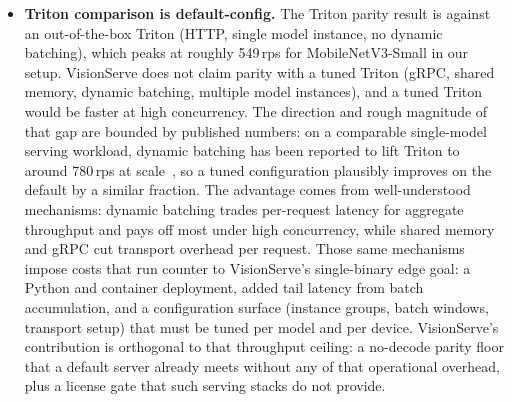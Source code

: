 \begin{itemize}
    \item \textbf{Triton comparison is default-config.}
          The Triton parity result is against an out-of-the-box Triton (HTTP, single
          model instance, no dynamic batching), which peaks at roughly 549\,rps for
          MobileNetV3-Small in our setup. VisionServe does not claim parity with a
          tuned Triton (gRPC, shared memory, dynamic batching, multiple model
          instances), and a tuned Triton would be faster at high concurrency. The
          direction and rough magnitude of that gap are bounded by published numbers:
          on a comparable single-model serving workload, dynamic batching has been
          reported to lift Triton to around 780\,rps at scale~\cite{ali2026fastapitriton},
          so a tuned configuration plausibly improves on the default by a similar
          fraction. The advantage comes from well-understood mechanisms: dynamic
          batching trades per-request latency for aggregate throughput and pays off
          most under high concurrency, while shared memory and gRPC cut transport
          overhead per request. Those same mechanisms impose costs that run counter
          to VisionServe's single-binary edge goal: a Python and container deployment,
          added tail latency from batch accumulation, and a configuration surface
          (instance groups, batch windows, transport setup) that must be tuned per
          model and per device. VisionServe's contribution is orthogonal to that
          throughput ceiling: a no-decode parity floor that a default server already
          meets without any of that operational overhead, plus a license gate that
          such serving stacks do not provide.

\end{itemize}
